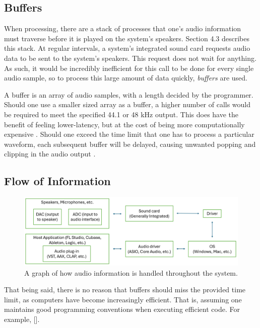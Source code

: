 \documentclass[12pt]{article}
\begin{document}
\subsection{Buffers}
When processing, there are a stack of processes that one's audio information must traverse before it is played on the system's speakers. Section 4.3 describes this stack. At regular intervals, a system's integrated sound card requests audio data to be sent to the system's speakers. This request does not wait for anything. \cite{Doumler} As such, it would be incredibly inefficient for this call to be done for every single audio sample, so to process this large amount of data quickly, \textit{buffers} are used. 

A buffer is an array of audio samples, with a length decided by the programmer. Should one use a smaller sized array as a buffer, a higher number of calls would be required to meet the specified 44.1 or 48 kHz output. This does have the benefit of feeling lower-latency, but at the cost of being more computationally expensive \cite{Doumler}. Should one exceed the time limit that one has to process a particular waveform, each subsequent buffer will be delayed, causing unwanted popping and clipping in the audio output \cite{Goodlife}.  

\subsection{Flow of Information}

\begin{center}
	\begin{figure}[h]
		\includegraphics[scale=0.4]{image1.png}
		\caption{A graph of how audio information is handled throughout the system.}
	\end{figure}
\end{center}

That being said, there is no reason that buffers should miss the provided time limit, as computers have become increasingly efficient. That is, assuming one maintains good programming conventions when executing efficient code. For example, [].
\end{document}
